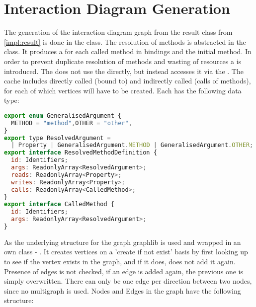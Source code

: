 \section{Interaction Diagram Generation}
The generation of the interaction diagram graph from the result class from \ref{impl:result} is done in the  class. The resolution of methods is abstracted in the  class. It produces a 
\linebreak {} for each called method in bindings and the initial method. In order to prevent duplicate resolution of methods and wasting of resources a  is introduced. The  does not use the  directly, but instead accesses it via the . The cache includes directly called (bound to) and indirectly called (calls of methods), for each of which vertices will have to be created. 
Each  has the following data type:
\begin{lstlisting}[language=JavaScript
  , caption={Resolved arguments and methods data type}, captionpos=b]
export enum GeneralisedArgument {
  METHOD = "method",OTHER = "other",
}
export type ResolvedArgument =
  | Property | GeneralisedArgument.METHOD | GeneralisedArgument.OTHER;
export interface ResolvedMethodDefinition {
  id: Identifiers;
  args: ReadonlyArray<ResolvedArgument>;
  reads: ReadonlyArray<Property>;
  writes: ReadonlyArray<Property>;
  calls: ReadonlyArray<CalledMethod>;
}
export interface CalledMethod {
  id: Identifiers;
  args: ReadonlyArray<ResolvedArgument>;
}
\end{lstlisting}


As the underlying structure for the graph graphlib is used and wrapped in an own class - . It creates vertices on a 'create if not exist' basis by first looking up to see if the vertex exists in the graph, and if it does, does not add it again. Presence of edges is not checked, if an edge is added again, the previous one is simply overwritten. There can only be one edge per direction between two nodes, since no multigraph is used. Nodes and Edges in the graph have the following structure:

